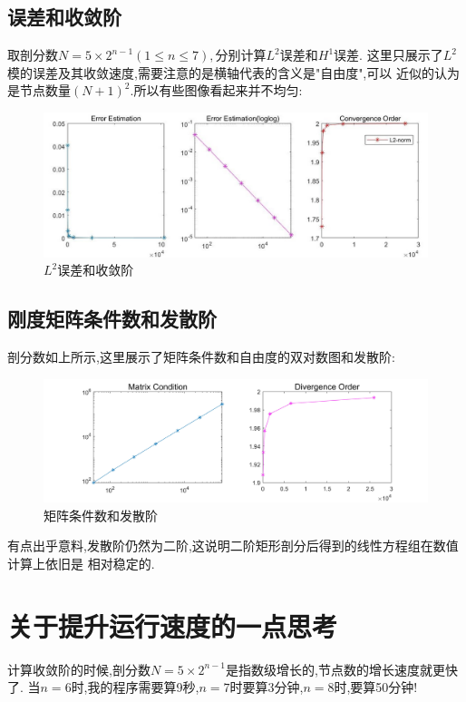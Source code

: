 \documentclass[11pt,reqno]{article}
\numberwithin{equation}{section}
\begin{document}
\newpage

\subsection{误差和收敛阶}
取剖分数$N=5\times2^{n-1}(1\le n\le 7),$分别计算$L^2$误差和$H^1$误差.
这里只展示了$L^2$模的误差及其收敛速度,需要注意的是横轴代表的含义是"自由度",可以
近似的认为是节点数量$(N+1)^2.$所以有些图像看起来并不均匀:
\begin{figure}[h]
	\centering
	  \includegraphics[width=\textwidth]{L2error.jpg}
	  \caption{$L^2$误差和收敛阶}
\end{figure}

\subsection{刚度矩阵条件数和发散阶}
剖分数如上所示,这里展示了矩阵条件数和自由度的双对数图和发散阶:
\begin{figure}[h]
	\centering
	  \includegraphics[width=\textwidth]{mc.jpg}
	  \caption{矩阵条件数和发散阶}
\end{figure}
有点出乎意料,发散阶仍然为二阶,这说明二阶矩形剖分后得到的线性方程组在数值计算上依旧是
相对稳定的.

\newpage
\section{关于提升运行速度的一点思考}

计算收敛阶的时候,剖分数$N=5\times2^{n-1}$是指数级增长的,节点数的增长速度就更快了.
当$n=6$时,我的程序需要算9秒,$n=7$时要算3分钟,$n=8$时,要算50分钟!
\end{document}
